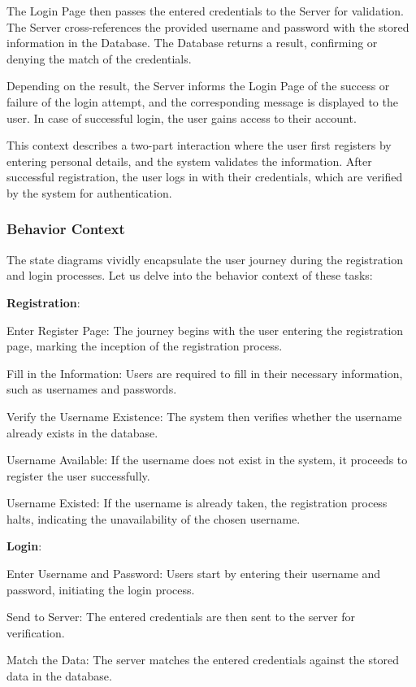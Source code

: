 \documentclass[conference]{IEEEtran}
\begin{document}
The Login Page then passes the entered credentials to the Server for validation.
The Server cross-references the provided username and password with the stored information in the Database. The Database returns a result, confirming or denying the match of the credentials.

Depending on the result, the Server informs the Login Page of the success or failure of the login attempt, and the corresponding message is displayed to the user. In case of successful login, the user gains access to their account.

This context describes a two-part interaction where the user first registers by entering personal details, and the system validates the information. After successful registration, the user logs in with their credentials, which are verified by the system for authentication.

\subsubsection{\textbf{Behavior Context}}
\textbf{}

The state diagrams vividly encapsulate the user journey during the registration and login processes. Let us delve into the behavior context of these tasks:

\textbf{Registration}:

Enter Register Page: The journey begins with the user entering the registration page, marking the inception of the registration process.

Fill in the Information: Users are required to fill in their necessary information, such as usernames and passwords.

Verify the Username Existence: The system then verifies whether the username already exists in the database.

Username Available: If the username does not exist in the system, it proceeds to register the user successfully.

Username Existed: If the username is already taken, the registration process halts, indicating the unavailability of the chosen username.

\textbf{Login}:

Enter Username and Password: Users start by entering their username and password, initiating the login process.

Send to Server: The entered credentials are then sent to the server for verification.

Match the Data: The server matches the entered credentials against the stored data in the database.
\end{document}
